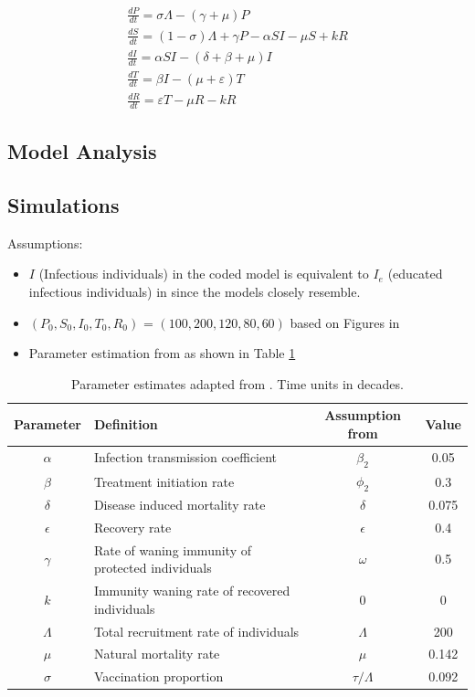 \documentclass{book}
\begin{document}
\begin{equation}
\begin{array}{l}
\frac{d P}{d t}=\sigma \Lambda-(\gamma+\mu) P \\
\frac{d S}{d t}=(1-\sigma) \Lambda+\gamma P-\alpha S I-\mu S+k R \\
\frac{d I}{d t}=\alpha S I-(\delta+\beta+\mu) I \\
\frac{d T}{d t}=\beta I-(\mu+\varepsilon) T \\
\frac{d R}{d t}=\varepsilon T-\mu R-k R
\end{array}
\end{equation}

\subsection*{Model Analysis}
\subsection*{Simulations}
Assumptions:
\begin{itemize}
    \item $I$ (Infectious individuals) in the coded model is equivalent to $I_e$ (educated infectious individuals) in \cite{akinduko2018series} since the models closely resemble.
    \item $(P_0, S_0, I_0, T_0, R_0)$ = $(100, 200, 120, 80,60)$ based on Figures in \cite{akinduko2018series}
    \item Parameter estimation from \cite{akinduko2018series} as shown in Table \ref{tab:typhoid_params}
\end{itemize}

\begin{table}[]
    \centering
    \begin{tabular}{c l c c}\hline
        Parameter & Definition & Assumption from \cite{akinduko2018series} & Value  \\ \hline
         $\alpha$ & Infection transmission coefficient & $\beta_2$ & 0.05\\
         $\beta$ & Treatment initiation rate & $\phi_2$ & 0.3\\
         $\delta$ & Disease induced mortality rate & $\delta$ & 0.075\\
         $\epsilon$ & Recovery rate & $\epsilon$ & 0.4\\
         $\gamma$ & Rate of waning immunity of protected individuals & $\omega$ & 0.5\\
         $k$ & Immunity waning rate of recovered individuals & $0$ & 0\\
         $\Lambda$ &Total recruitment rate of individuals & $\Lambda$ & 200\\
         $\mu$ & Natural mortality rate & $\mu$ & 0.142\\
         $\sigma$ & Vaccination proportion & $\tau/\Lambda$ &0.092\\ \hline
    \end{tabular}
    \caption{Parameter estimates adapted from \cite{akinduko2018series}. Time units in decades. }
    \label{tab:typhoid_params}
\end{table}
\end{document}
